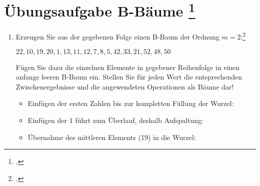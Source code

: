 \documentclass{bschlangaul-aufgabe}
\begin{document}

\section{Übungsaufgabe B-Bäume
\footcite[Thema 2 Aufgabe 6 (Adaptiert)]{66112:2005:09}
}

\begin{enumerate}


\item Erzeugen Sie aus der gegebenen Folge einen B-Baum der Ordnung
$m=2$:\footcite[Seite 34-37(PDF 28-31)]{aud:fs:5}

$22,10,19,20,1,13,11,12,7,8,5,42,33,21,52,48,50$

Fügen Sie dazu die einzelnen Elemente in gegebener Reihenfolge in einen
anfangs leeren B-Baum ein. Stellen Sie für jeden Wert die entsprechenden
Zwischenergebnisse und die angewendeten Operationen als Bäume dar!

\begin{itemize}

%

\item {}    Einfügen der ersten
Zahlen bis zur kompletten Füllung der Wurzel:


%

\item {} Einfügen der 1 führt zum Überlauf, deshalb Aufspaltung:


%

\item Übernahme des mittleren Elements (19) in die Wurzel:



\end{itemize}
\end{enumerate}
\end{document}
